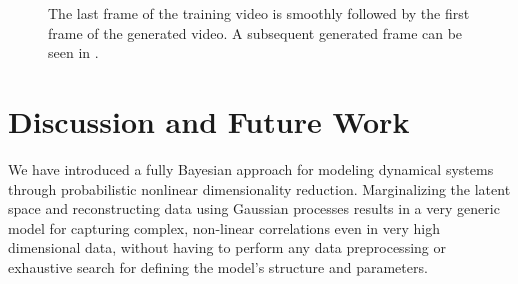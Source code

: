 \documentclass{article} %
\begin{document}
\begin{figure}[ht]
\begin{center}
\end{center}
\caption{ \small{
The last frame of the training video  is smoothly followed by the first frame  of the generated video. A subsequent generated frame can be seen in }.}
\label{fig:dog}
\end{figure}





\section{Discussion and Future Work}

We have introduced a fully Bayesian approach for modeling dynamical
systems through probabilistic nonlinear dimensionality
reduction. Marginalizing the latent space and reconstructing data
using Gaussian processes results in a very generic model for capturing
complex, non-linear correlations even in very high dimensional data,
without having to perform any data preprocessing or exhaustive search
for defining the model's structure and parameters.
\end{document}
